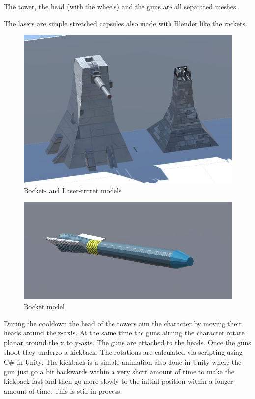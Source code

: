 \documentclass[12pt, letterpaper]{scrartcl}
\begin{document}
	The tower, the head (with the wheels) and the guns are all separated meshes.
	
	The lasers are simple stretched capsules also made with Blender like the rockets.
	
	\begin{figure}[H]
		\centering
		\includegraphics[scale=0.6]{images//interim/turrets}
		\caption{Rocket- and Laser-turret models}
	\end{figure}
	
	\begin{figure}[H]
		\centering
		\includegraphics[scale=0.5]{images//interim/rocket}
		\caption{Rocket model}
	\end{figure}
	
	During the cooldown the head of the towers aim the character by moving their heads around the z-axis. At the same time the guns aiming the character rotate planar around the x to y-axis. The guns are attached to the heads. Once the guns shoot they undergo a kickback. The rotations are calculated via scripting using C\# in Unity. The kickback is a simple animation also done in Unity where the gun just go a bit backwards within a very short amount of time to make the kickback fast and then go more slowly to the initial position within a longer amount of time. This is still in process.
	
\end{document}
